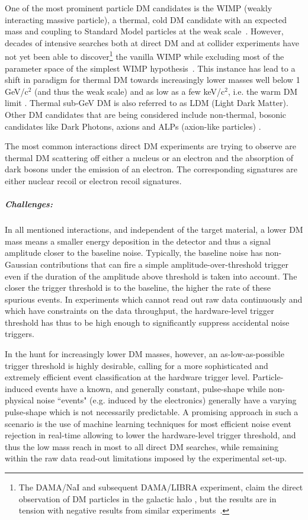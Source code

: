 One of the most prominent particle DM candidates is the WIMP (weakly interacting massive particle), a thermal, cold DM candidate with an expected mass and coupling to Standard Model particles at the weak scale~\cite{Jungman_1996}. 
However, decades of intensive searches both at direct DM and at collider experiments have not yet been able to discover\footnote{The DAMA/NaI and subsequent DAMA/LIBRA experiment, claim the direct observation of DM particles in the galactic halo \cite{Bernabei_2013}, but the results are in tension with negative results from similar experiments~\cite{Schumann_2019}.} the vanilla WIMP while excluding most of the parameter space of the simplest WIMP hypothesis~\cite{Schumann_2019}. 
This instance has lead to a shift in paradigm for thermal DM towards increasingly lower masses well below 1\,GeV/c$^2$ (and thus the weak scale) \cite{B_hm_2004} and as low as a few keV/c$^2$, i.e. the warm DM limit \cite{Weinberg_2015}. 
Thermal sub-GeV DM is also referred to as LDM (Light Dark Matter). Other DM candidates that are being considered include non-thermal, bosonic candidates like Dark Photons, axions and ALPs (axion-like particles) \cite{Peccei:2006as, Svrcek:2006yi, Holdom:1985ag}.

The most common interactions direct DM experiments are trying to observe are thermal DM scattering off either a nucleus or an electron and the absorption of dark bosons under the emission of an electron. 
The corresponding signatures are either nuclear recoil or electron recoil signatures.


\subparagraph*{Challenges:} In all mentioned interactions, and independent of the target material, a lower DM mass means a smaller energy deposition in the detector and thus a signal amplitude closer to the baseline noise. Typically, the baseline noise has non-Gaussian contributions that can fire a simple amplitude-over-threshold trigger even if the duration of the amplitude above threshold is taken into account. The closer the trigger threshold is to the baseline, the higher the rate of these spurious events. In experiments which cannot read out raw data continuously and which have constraints on the data throughput, the hardware-level trigger threshold has thus to be high enough to significantly suppress accidental noise triggers.

In the hunt for increasingly lower DM masses, however, an as-low-as-possible trigger threshold is highly desirable, calling for a more sophisticated and extremely efficient event classification at the hardware trigger level. Particle-induced events have a known, and generally constant, pulse-shape while non-physical noise ``events" (e.g. induced by the electronics) generally have a varying pulse-shape which is not necessarily predictable. 
A promising approach in such a scenario is the use of machine learning techniques for most efficient noise event rejection in real-time allowing to lower the hardware-level trigger threshold, and thus the low mass reach in most to all direct DM searches, while remaining within the raw data read-out limitations imposed by the experimental set-up.


